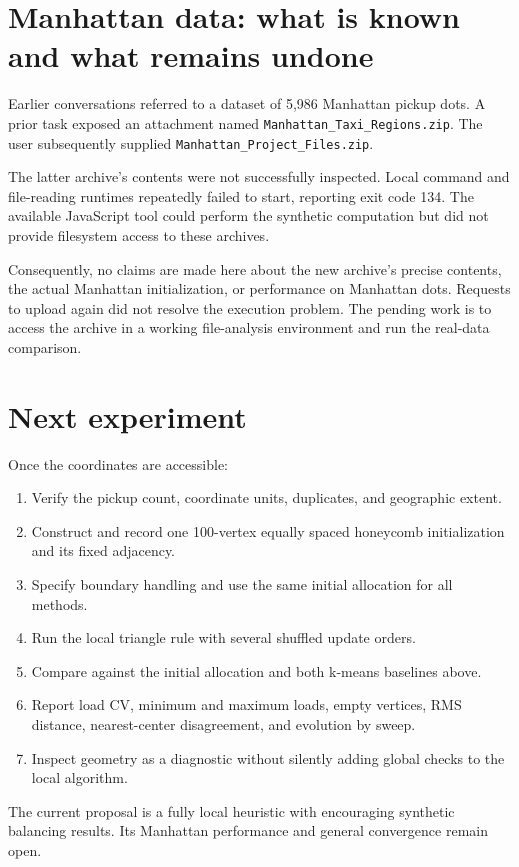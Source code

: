 \documentclass[11pt]{article}
\begin{document}
\section{Manhattan data: what is known and what remains undone}
Earlier conversations referred to a dataset of 5,986 Manhattan pickup dots. A prior task exposed an attachment named \texttt{Manhattan\_Taxi\_Regions.zip}. The user subsequently supplied \texttt{Manhattan\_Project\_Files.zip}.

The latter archive's contents were not successfully inspected. Local command and file-reading runtimes repeatedly failed to start, reporting exit code 134. The available JavaScript tool could perform the synthetic computation but did not provide filesystem access to these archives.

Consequently, no claims are made here about the new archive's precise contents, the actual Manhattan initialization, or performance on Manhattan dots. Requests to upload again did not resolve the execution problem. The pending work is to access the archive in a working file-analysis environment and run the real-data comparison.

\section{Next experiment}
Once the coordinates are accessible:
\begin{enumerate}
\item Verify the pickup count, coordinate units, duplicates, and geographic extent.
\item Construct and record one 100-vertex equally spaced honeycomb initialization and its fixed adjacency.
\item Specify boundary handling and use the same initial allocation for all methods.
\item Run the local triangle rule with several shuffled update orders.
\item Compare against the initial allocation and both k-means baselines above.
\item Report load CV, minimum and maximum loads, empty vertices, RMS distance, nearest-center disagreement, and evolution by sweep.
\item Inspect geometry as a diagnostic without silently adding global checks to the local algorithm.
\end{enumerate}
The current proposal is a fully local heuristic with encouraging synthetic balancing results. Its Manhattan performance and general convergence remain open.
\end{document}
